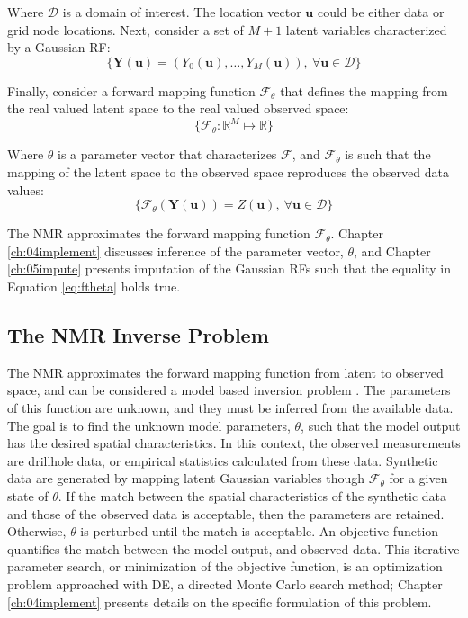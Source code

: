 Where $\mathcal{D}$ is a domain of interest. The location vector $\mathbf{u}$ could be either data or grid node locations. Next, consider a set of $M+1$ latent variables characterized by a Gaussian \gls{RF}:
\begin{equation}
    \{\mathbf{Y}(\mathbf{u}) = (Y_{0}(\mathbf{u}), \dots, Y_{M}(\mathbf{u})), \ \forall \mathbf{u} \in \mathcal{D}\}
    \label{eq:gpool}
\end{equation}

Finally, consider a forward mapping function $\mathcal{F}_{\theta}$ that defines the mapping from the real valued latent space to the real valued observed space:
\begin{equation}
    \{\mathcal{F}_{\theta}: \mathbb{R}^{M} \mapsto \mathbb{R} \}
    \label{eq:fmap}
\end{equation}

Where $\theta$ is a parameter vector that characterizes $\mathcal{F}$, and $\mathcal{F}_{\theta}$ is such that the mapping of the latent space to the observed space reproduces the observed data values:
\begin{equation}
    \{\mathcal{F}_{\theta}(\mathbf{Y}(\mathbf{u})) = Z(\mathbf{u}), \ \forall \mathbf{u} \in \mathcal{D}\}
    \label{eq:ftheta}
\end{equation}

The \gls{NMR} approximates the forward mapping function $\mathcal{F}_{\theta}$. Chapter \ref{ch:04implement} discusses inference of the parameter vector, $\theta$, and Chapter \ref{ch:05impute} presents imputation of the Gaussian \glspl{RF} such that the equality in Equation \ref{eq:ftheta} holds true.

\subsection{The NMR Inverse Problem}
\label{subsec:03nmrinverse}

The \gls{NMR} approximates the forward mapping function from latent to observed space, and can be considered a model based inversion problem \citep{sen2013global}. The parameters of this function are unknown, and they must be inferred from the available data. The goal is to find the unknown model parameters, $\theta$, such that the model output has the desired spatial characteristics. In this context, the observed measurements are drillhole data, or empirical statistics calculated from these data. Synthetic data are generated by mapping latent Gaussian variables though $\mathcal{F}_{\theta}$ for a given state of $\theta$. If the match between the spatial characteristics of the synthetic data and those of the observed data is acceptable, then the parameters are retained. Otherwise, $\theta$ is perturbed until the match is acceptable. An objective function quantifies the match between the model output, and observed data. This iterative parameter search, or minimization of the objective function, is an optimization problem approached with \gls{DE}, a directed Monte Carlo search method; Chapter \ref{ch:04implement} presents details on the specific formulation of this problem.

